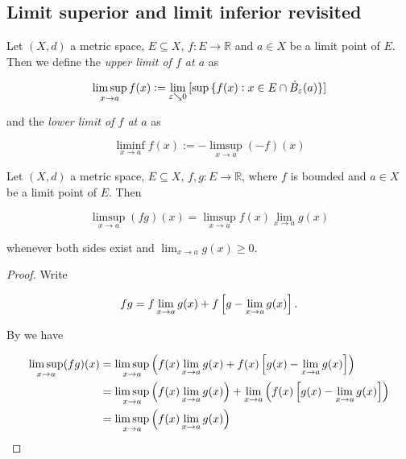 



\originalsectionstyle

\appendix
\begin{appendix}
	\section{Limit superior and limit inferior revisited}
	\begin{definition}
		Let $(X,d)$ a metric space, $E \subseteq X$, $f: E \to \mathbb{R}$ and $a \in X$ be a limit point of $E$. Then we define the \emph{upper limit of  $f$ at $a$} as

		\begin{equation*}
			\limsup_{x \to a}f(x) := \lim_{\varepsilon \searrow 0} \sbr[0]{ \sup\cbr[0]{ f(x) : x \in E \cap \dot{B}_\varepsilon(a)}}
		\end{equation*}

		\noindent and the \emph{lower limit of  $f$ at $a$} as

		\begin{equation*}
			\liminf_{x \to a}f(x) := -\limsup_{x \to a}( -f)(x)
		\end{equation*}
	\end{definition}

	\begin{proposition}
		Let $(X,d)$ a metric space, $E \subseteq X$, $f,g: E \rightarrow \mathbb{R}$, where $f$ is bounded and $a \in X$ be a limit point of $E$. Then 

		\begin{equation*}
			\limsup_{x \to a} (fg)(x) = \limsup_{x \to a} f(x) \lim_{x \to a} g(x)
		\end{equation*}

		\noindent whenever both sides exist and $\lim_{x \to a}g(x) \geq 0$.
		\label{prop:limsup}
	\end{proposition}

	\begin{proof}
		Write

		\begin{equation*}
			fg = f\lim_{x\to a}g(x) + f\sbr[2]{ g - \lim_{x \to a}g(x)}.
		\end{equation*}

		By \cite[358]{bourbaki:general_topology:1995} we have

		\begin{gather*}
			\begin{aligned}
				\limsup_{x \to a} (fg)(x) &= \limsup_{x \to a}\del[2]{ f(x)\lim_{x\to a}g(x) + f(x)\sbr[2]{ g(x) - \lim_{x \to a}g(x)}}\\
				&= \limsup_{x \to a}\del[2]{ f(x)\lim_{x \to a}g(x)} + \lim_{x \to a}\del[2]{ f(x)\sbr[2]{ g(x) - \lim_{x \to a}g(x)}}\\
				&= \limsup_{x \to a}\del[2]{ f(x) \lim_{x \to a}g(x)}
			\end{aligned}
		\end{gather*}


\end{proof}
\end{appendix}
